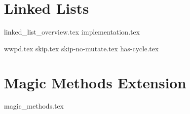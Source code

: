 \documentclass{exam}
\begin{document}
\newpage
\section{Linked Lists}
{linked_list_overview.tex}
{implementation.tex}
\begin{questions}
{wwpd.tex}
{skip.tex}
{skip-no-mutate.tex}
{has-cycle.tex}
\end{questions}

\newpage
\section{Magic Methods Extension}
{magic_methods.tex}
\end{document}
